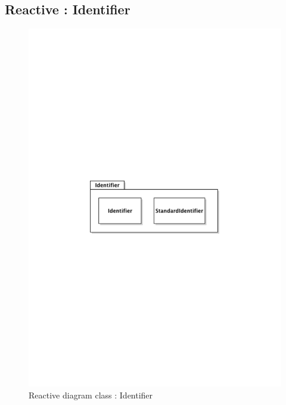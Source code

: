 	\subsection{Reactive : Identifier}
		\begin{figure}[ht]
			\begin{center}
				\includegraphics[width=\textwidth,  trim=2cm 12cm 2cm 12cm]{UML_figure/DC/core/reactive/DC_Identifier.pdf}
				\caption{Reactive diagram class : Identifier}
			\end{center}
		\end{figure}
\newpage
